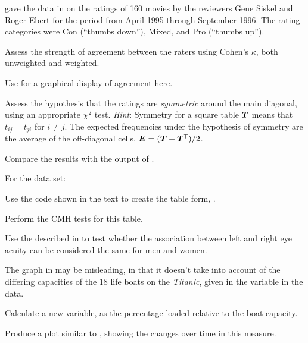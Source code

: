 \documentclass[10pt,krantz2]{krantz}\usepackage[]{graphicx}\usepackage[]{color}
\begin{document}
\begin{Exercises}
  \exercise \citet{AgrestiWinner:1997} gave the data in  on the
  ratings of 160 movies by the reviewers Gene Siskel and Roger Ebert for the period
  from April 1995 through September 1996. The rating categories were Con (``thumbs down''),
  Mixed, and Pro (``thumbs up'').
  
  \begin{enumerate*}
     \item Assess the strength of agreement between the raters using Cohen's
       $\kappa$, both unweighted and weighted.
     \item Use  for a graphical display of agreement here.
     \item Assess the hypothesis that the ratings are \emph{symmetric} around the
       main diagonal, using an appropriate $\chi^2$ test.
       \emph{Hint}:  Symmetry for a square table $\bm{T}$ means that $t_{ij} = t_{ji}$
       for $i \ne j$.  The expected frequencies under the hypothesis of symmetry
       are the average of the off-diagonal cells,
       $\bm{E} = (\bm{T} + \bm{T}^\mathsf{T}) / 2$.
     \item Compare the results with the output of .
     \end{enumerate*}

  \exercise For the  data set:
    \begin{enumerate*}
      \item Use the code shown in the text to create the table form, .
      \item Perform the CMH tests for this table.
      \item Use the  described in  to
      test whether the association between left and right eye acuity can be
      considered the same for men and women.
    \end{enumerate*}

  \exercise The graph in  may be misleading, in that it doesn't
  take into account of the differing capacities of the 18 life boats on the
  \emph{Titanic}, given in the variable  in the  data.
    \begin{enumerate*}
      \item Calculate a new variable,  as the percentage
      loaded relative to the boat capacity.
      \item Produce a plot similar to , showing the
      changes over time in this measure.
    \end{enumerate*}

\end{Exercises}
\end{document}
